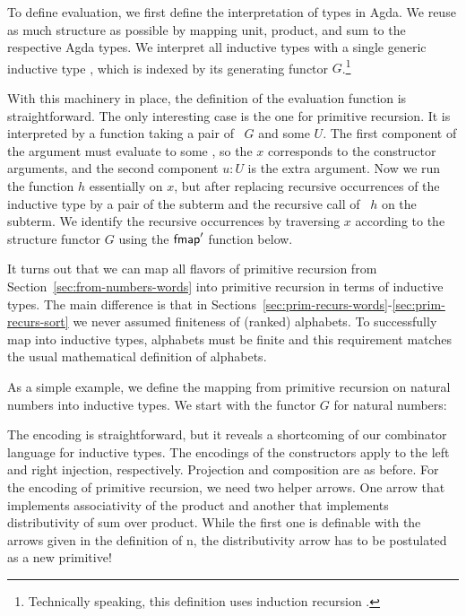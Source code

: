 \documentclass{jfp}
\begin{document}
To define evaluation, we first define the interpretation of types in Agda.
\ccDataAlg
We reuse as much structure as possible by mapping unit, product, and
sum to the respective Agda types. We interpret all inductive types with a
single generic inductive type , which is indexed by its generating
functor $G$.\footnote{Technically speaking, this definition uses
  induction recursion \cite{DBLP:journals/apal/DybjerS03}.}

With this machinery in place, the definition of the evaluation
function is straightforward.
\ccFunEval
The only interesting case is the one for primitive recursion. It is
interpreted by a function taking a pair of \Aind~$G$ and some $U$. The
first component of the argument must evaluate to some \Afold, so the $x$ corresponds
to the constructor arguments, and the second component $u:U$ is the
extra argument. Now we run the function $h$ essentially on $x$, but
after replacing recursive occurrences of the inductive type by a pair
of the subterm and the recursive call of {\AP}~$h$ on the subterm. We
identify the recursive occurrences by traversing $x$ according to the
structure functor $G$ using the $\Afmap'$ function below. 
\ccFunFmap

It turns out that we can map all flavors of primitive recursion from
Section~\ref{sec:from-numbers-words} into primitive recursion in terms
of inductive types. The main difference is that in
Sections~\ref{sec:prim-recurs-words}-\ref{sec:prim-recurs-sort} we
never assumed finiteness of (ranked) alphabets. To successfully map into
inductive types, alphabets must be finite and this requirement
matches the usual mathematical definition of alphabets.

As a simple example, we define the mapping from primitive recursion on
natural numbers into inductive types. We start with the functor $G$
for natural numbers:
\ccDefGNat

The encoding is straightforward, but it reveals a shortcoming of our
combinator language for inductive types.
\ccDefNatToInd
The encodings of the constructors apply {\Afold} to the left and right
injection, respectively. Projection and composition are as before. For
the encoding of primitive recursion, we need two helper arrows. One
arrow that implements associativity of the product and another that
implements distributivity of sum over product. While the first one is
definable with the arrows given in the definition of {\APR n}, the
distributivity arrow has to be postulated as a new primitive!
\ccFunAssocDist
\end{document}
